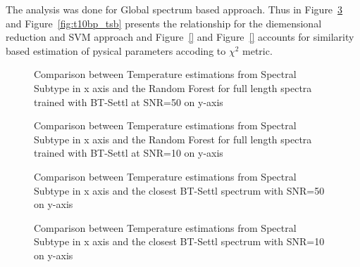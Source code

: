 {The analysis was done for Global spectrum based approach. 
Thus in Figure~\ref{fig:t50bp_tsb} and Figure~\ref{fig:t10bp_tsb} presents the relationship for 
the diemensional reduction and SVM approach and 
Figure~\ref{} and Figure~\ref{} accounts for similarity 
based estimation of pysical parameters accoding to $\chi^2$ metric.

\begin {figure}
 \begin{center}
 \caption{Comparison between Temperature estimations from Spectral Subtype 
 in x axis and the Random Forest for full length spectra trained with BT-Settl 
 at SNR=50 on y-axis}
 \label{fig:t50bp_tsb}
 \end{center}
\end {figure}

\begin {figure}
 \begin{center}
 \caption{Comparison between Temperature estimations from Spectral Subtype 
 in x axis and the Random Forest for full length spectra trained with BT-Settl 
 at SNR=10 on y-axis}
 \label{fig:t10BP_tsb}
 \end{center}
\end {figure}

\begin {figure}
 \begin{center}
 \caption{Comparison between Temperature estimations from Spectral Subtype 
 in x axis and the closest BT-Settl spectrum with SNR=50 on y-axis}
 \label{fig:t50bp_tsb}
 \end{center}
\end {figure}

\begin {figure}
 \begin{center}
 \caption{Comparison between Temperature estimations from Spectral Subtype 
 in x axis and the closest BT-Settl spectrum with SNR=10 on y-axis}
 \label{fig:t10BP_tsb}
 \end{center}
\end {figure}

%
}


